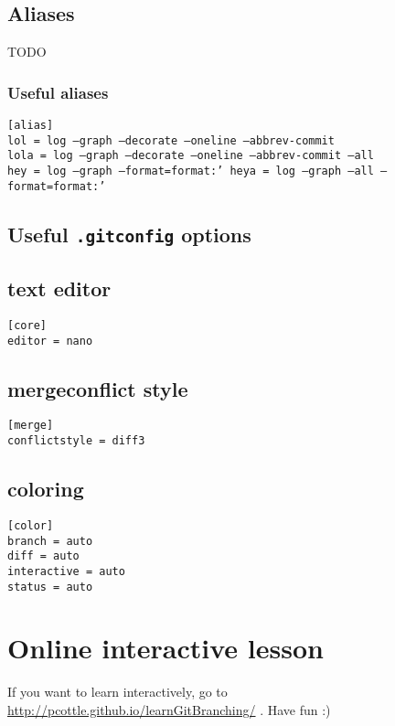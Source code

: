 \documentclass[12pt]{article}
\begin{document}
\subsection{Aliases}
TODO

\subsubsection{Useful aliases}
\texttt{[alias]\\
lol = log --graph --decorate --oneline --abbrev-commit\\
lola = log --graph --decorate --oneline --abbrev-commit --all\\
hey = log --graph --format=format:'%
heya = log --graph --all --format=format:'%
}

\subsection{Useful \texttt{.gitconfig} options}


\subsection{text editor}

\texttt{[core]\\
editor = nano }

\subsection{mergeconflict style}
\texttt{[merge]\\
conflictstyle = diff3 }

\subsection{coloring}
\texttt{[color]\\
  branch = auto\\
  diff = auto\\
  interactive = auto\\
  status = auto }

\section{Online interactive lesson}
If you want to learn interactively, go to \url{http://pcottle.github.io/learnGitBranching/} . Have fun :)
\end{document}
